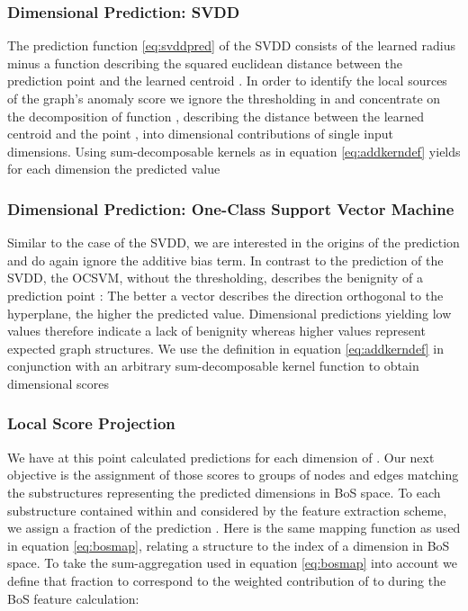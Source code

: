 \documentclass{llncs}
\begin{document}
\subsubsection{Dimensional Prediction: SVDD}

The prediction function \eqref{eq:svddpred} of the SVDD consists of the learned radius  minus a function  describing the squared euclidean distance between the prediction point  and the learned centroid . In order to identify the local sources of the graph's anomaly score we ignore the thresholding in  and concentrate on the decomposition of function , describing the distance between the learned centroid  and the point , into dimensional contributions  of single input dimensions. Using sum-decomposable kernels as in equation \eqref{eq:addkerndef} yields for each dimension  the predicted value



\subsubsection{Dimensional Prediction: One-Class Support Vector Machine}

Similar to the case of the SVDD, we are interested in the origins of the prediction and do again ignore the additive bias term.
In contrast to the prediction of the SVDD, the OCSVM, without the thresholding,  describes the benignity of a prediction point : The better a vector  describes the direction  orthogonal to the hyperplane, the higher the predicted value.
Dimensional predictions  yielding low values therefore indicate a lack of benignity whereas higher values represent expected graph structures. We use the definition in equation \eqref{eq:addkerndef} in conjunction with an arbitrary sum-decomposable kernel function to obtain dimensional scores



\subsubsection{Local Score Projection}
\label{sec:localscore}

We have at this point calculated predictions for each dimension of . Our next objective is the assignment of those scores to groups of nodes and edges matching the substructures representing the predicted dimensions in BoS space.
To each substructure  contained within  and considered by the feature extraction scheme, we assign a fraction  of the prediction . Here  is the same mapping function as used in equation  \eqref{eq:bosmap}, relating a structure  to the index of a dimension in BoS space.
To take the sum-aggregation used in equation \eqref{eq:bosmap} into account we define that fraction to correspond to the weighted contribution of  to  during the BoS feature calculation:
\end{document}
